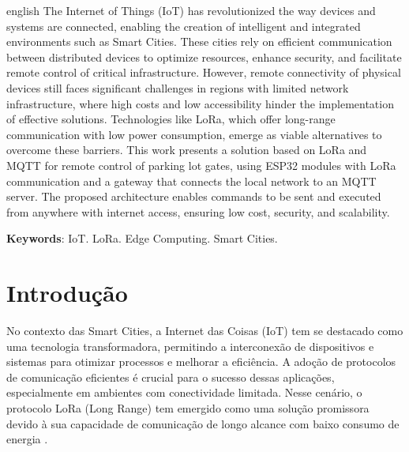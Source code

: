 \documentclass[
article,			%
11pt,				%
twoside,			%
a4paper,			%
section=TITLE,		%
onecolumn,          %
english,			%
brazil,				%
sumario=tradicional
]{abntex2}
\begin{document}
\renewcommand{\resumoname}{Abstract}
\begin{resumo}
    \begin{otherlanguage*}{english}
        The Internet of Things (IoT) has revolutionized the way devices and systems are connected, enabling the creation of intelligent and integrated environments such as Smart Cities. These cities rely on efficient communication between distributed devices to optimize resources, enhance security, and facilitate remote control of critical infrastructure. However, remote connectivity of physical devices still faces significant challenges in regions with limited network infrastructure, where high costs and low accessibility hinder the implementation of effective solutions. Technologies like LoRa, which offer long-range communication with low power consumption, emerge as viable alternatives to overcome these barriers. This work presents a solution based on LoRa and MQTT for remote control of parking lot gates, using ESP32 modules with LoRa communication and a gateway that connects the local network to an MQTT server. The proposed architecture enables commands to be sent and executed from anywhere with internet access, ensuring low cost, security, and scalability.
        
        \noindent
        \textbf{Keywords}: IoT. LoRa. Edge Computing. Smart Cities.
    \end{otherlanguage*}  
\end{resumo}


\vspace{\onelineskip}%

\textual

\section{Introdução}

No contexto das Smart Cities, a Internet das Coisas (IoT) tem se destacado como uma tecnologia transformadora, permitindo a interconexão de dispositivos e sistemas para otimizar processos e melhorar a eficiência. A adoção de protocolos de comunicação eficientes é crucial para o sucesso dessas aplicações, especialmente em ambientes com conectividade limitada. Nesse cenário, o protocolo LoRa (Long Range) tem emergido como uma solução promissora devido à sua capacidade de comunicação de longo alcance com baixo consumo de energia \cite{Yoon2020}.
\end{document}
